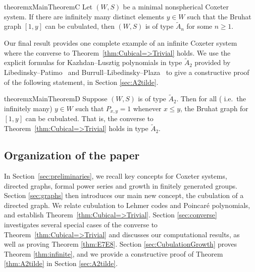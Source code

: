 \documentclass[11pt]{amsart}
\theoremstyle{plain}
\newtheorem{thm}{Theorem}[section]
\theoremstyle{definition}
\newcommand{\Pxy}{P_{x,y}} %
\numberwithin{equation}{subsection}
\begin{document}
\begin{restatable*}{theoremx}{MainTheoremC}%
\label{thm:infinite} 
Let $(W,S)$ be a minimal nonspherical Coxeter system. If there are infinitely many distinct elements $y \in W$ such that the Bruhat graph $[1,y]$ can be cubulated, then $(W,S)$ is of type $\tilde{A}_n$ for some $n \geq 1$.
\end{restatable*}

Our final result provides one complete example of an infinite Coxeter system where the converse to Theorem~\ref{thm:Cubical=>Trivial} holds. We use the explicit formulas for Kazhdan--Lusztig polynomials in type $\tilde{A}_2$ provided by Libedinsky--Patimo~\cite{LibedinskyPatimo} and Burrull--Libedinsky--Plaza~\cite{BurrullLibedinskyPlaza} to give a constructive proof of the following statement, in Section \ref{sec:A2tilde}.

\begin{restatable*}{theoremx}{MainTheoremD}%
\label{thm:A2tilde} 
Suppose $(W,S)$ is of type $\tilde{A}_2$. Then for all (%
i.e.~the infinitely many) $y \in W$ such that $\Pxy = 1$ whenever $x \leq y$, the Bruhat graph for $[1,y]$ can be cubulated.  That is, the converse to Theorem~\ref{thm:Cubical=>Trivial} holds in type $\tilde{A}_2$.
\end{restatable*}




\subsection{Organization of the paper}

In Section~\ref{sec:preliminaries}, we recall key concepts for Coxeter systems, directed graphs, formal power series and growth in finitely generated groups.  Section \ref{sec:graphs} then introduces our main new concept, the cubulation of a directed graph. We relate cubulation to Lehmer codes and Poincar\'e polynomials, and establish Theorem~\ref{thm:Cubical=>Trivial}. 
Section \ref{sec:converse} investigates several special cases of the converse to Theorem~\ref{thm:Cubical=>Trivial} and discusses our computational results, as well as proving Theorem \ref{thm:E7E8}.  
Section \ref{sec:CubulationGrowth} proves Theorem \ref{thm:infinite}, and we provide a constructive proof of Theorem \ref{thm:A2tilde}  in Section \ref{sec:A2tilde}.
\end{document}
